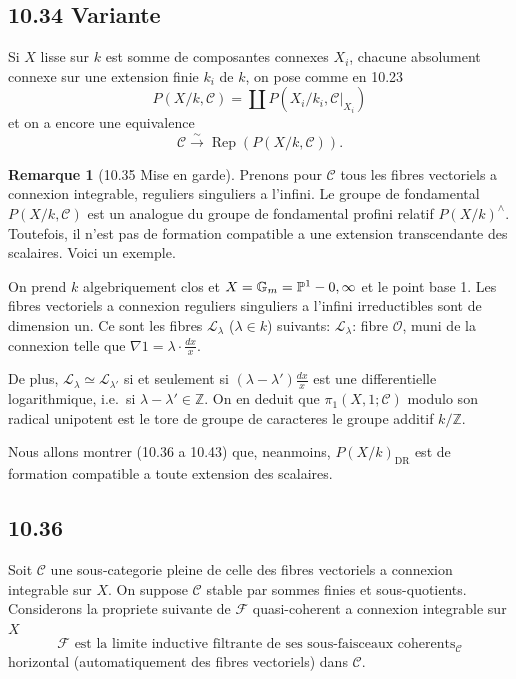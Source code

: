 \documentclass[12pt,a4paper]{article}
\theoremstyle{plain}
\theoremstyle{definition}
\newtheorem{remark}[theorem]{Remarque}
\theoremstyle{remark}
\DeclareMathOperator{\Rep}{Rep}
\newcommand{\Gm}{\mathbb{G}_m}
\newcommand{\Z}{\mathbb{Z}}
\newcommand{\DR}{\mathrm{DR}}
\begin{document}
\subsection*{10.34 Variante}

Si $X$ lisse sur $k$ est somme de composantes connexes $X_i$, chacune absolument connexe sur une extension finie $k_i$ de $k$, on pose comme en 10.23
$$P(X/k, \mathcal{C}) = \coprod P(X_i/k_i, \mathcal{C}|_{X_i})$$
et on a encore une equivalence
\begin{equation}\label{10.34.1}
\mathcal{C} \xrightarrow{\sim} \Rep(P(X/k, \mathcal{C})). \tag{10.34.1}
\end{equation}

\begin{remark}[10.35 Mise en garde]
Prenons pour $\mathcal{C}$ tous les fibres vectoriels a connexion integrable, reguliers singuliers a l'infini. Le groupe de fondamental $P(X/k, \mathcal{C})$ est un analogue du groupe de fondamental profini relatif $P(X/k)^\wedge$. Toutefois, il n'est pas de formation compatible a une extension transcendante des scalaires. Voici un exemple.

On prend $k$ algebriquement clos et $X = \Gm = \mathbb{P}^1 - \\{0, \infty\\}$ et le point base 1. Les fibres vectoriels a connexion reguliers singuliers a l'infini irreductibles sont de dimension un. Ce sont les fibres $\mathcal{L}_\lambda$ ($\lambda \in k$) suivants:
$\mathcal{L}_\lambda$: fibre $\mathcal{O}$, muni de la connexion telle que $\nabla 1 = \lambda \cdot \frac{dx}{x}$.

De plus, $\mathcal{L}_\lambda \simeq \mathcal{L}_{\lambda'}$ si et seulement si $(\lambda - \lambda')\frac{dx}{x}$ est une differentielle logarithmique, i.e.~si $\lambda - \lambda' \in \Z$. On en deduit que $\pi_1(X, 1; \mathcal{C})$ modulo son radical unipotent est le tore de groupe de caracteres le groupe additif $k/\Z$.

Nous allons montrer (10.36 a 10.43) que, neanmoins, $P(X/k)_{\DR}$ est de formation compatible a toute extension des scalaires.
\end{remark}

\subsection*{10.36}

Soit $\mathcal{C}$ une sous-categorie pleine de celle des fibres vectoriels a connexion integrable sur $X$. On suppose $\mathcal{C}$ stable par sommes finies et sous-quotients. Considerons la propriete suivante de $\mathcal{F}$ quasi-coherent a connexion integrable sur $X$
\begin{equation}\label{10.36.1}
\mathcal{F} \text{ est la limite inductive filtrante de ses sous-faisceaux coherents} \tag{10.36.1}_{\mathcal{C}}
\end{equation}
horizontal (automatiquement des fibres vectoriels) dans $\mathcal{C}$.
\end{document}
